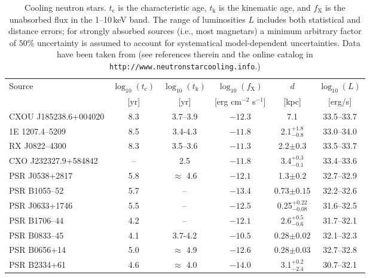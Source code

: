 \documentclass[smallextended]{svjour3}       %
\newcounter{count}
\begin{document}
\begin{table}
\caption{Cooling neutron stars. $t_\mathrm{c}$ is the
  characteristic age, $t_\mathrm{k}$ is the kinematic age,
  and $f_\mathrm{X}$ is the unabsorbed flux in the
  1--10\,keV band. The range of luminosities $L$ includes
  both statistical and distance errors; for strongly
  absorbed sources (i.e., most magnetars) a minimum
  arbitrary factor of $50\%$ uncertainty is assumed to
  account for systematical model-dependent uncertainties.
  Data have been taken from \cite{vigano13} (see references
  therein and the online catalog in
  \texttt{http://www.neutronstarcooling.info}.) }
\begin{center}
\begin{tabular}{l c c c c c }
\hline
\hline
Source & $\log_{10} (t_\mathrm{c})$ & $\log_{10}
(t_\mathrm{k})$ & $\log_{10}(f_\mathrm{X})$ & $d$  &
$\log_{10}(L)$  \\[0pt]
& [yr] & [yr] & [erg cm$^{-2}$ s$^{-1}$] & [kpc] & [erg/s]
\\[.5ex]
\hline
 CXOU J185238.6+004020 & 8.3 & 3.7--3.9 & $ -12.3$ &        
          7.1 &   33.5--33.7 \rule{0pt}{3ex} \\
        1E 1207.4--5209          &  8.5 & 3.4-4.3 & $-11.8$ &
2.1$^{+ 1.8}_{- 0.8}$ &    33.0--34.0 \\
         RX J0822--4300          &  8.3 & 3.5--3.6 & $-11.3$
&          2.2$\pm 0.3$ &     33.5--33.7 \\
  CXO J232327.9+584842  &   --  & 2.5 & $     -11.8$ &
3.4$^{+ 0.3}_{- 0.1}$ &   33.4--33.6 \\
        PSR J0538+2817       & 5.8 & $\approx$ 4.6 & $-12.1$
&          1.3$\pm 0.2$ &    32.7--32.9 \\
          PSR B1055--52         &  5.7 & -- & $-13.4$ &      
  0.73$\pm0.15$ &    32.2--32.6 \\
        PSR J0633+1746       &  5.5 & -- & $-12.5$
&0.25$^{+0.22}_{-0.08}$ &  31.6--32.5 \\
          PSR B1706--44         &  4.2  & -- & $-12.1$ &
2.6$^{+ 0.5}_{- 0.6}$ &    31.7--32.1 \\
          PSR B0833--45         &  4.1 & 3.7-4.2 & $-10.5$ & 
       0.28$\pm0.02$ &   32.1--32.3 \\
          PSR B0656+14        &  5.0  & $\approx$ 4.9 &
$-12.6$ &         0.28$\pm0.03$ &     32.7--32.8 \\
          PSR B2334+61        &  4.6  & $\approx$ 4.0 &
$-14.0$ & 3.1$^{+ 0.2}_{- 2.4}$ &     30.7--32.1 \\

\end{tabular}
\end{center}
\end{table}
\end{document}
